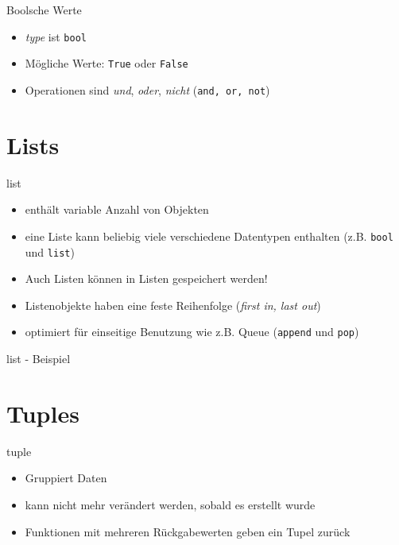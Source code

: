 \begin{frame}{Boolsche Werte}
	\begin{itemize}
		\item \textit{type} ist \alert{\texttt{bool}}
		\item Mögliche Werte: \texttt{True} oder \texttt{False}
		\item Operationen sind \textit{und}, \textit{oder}, \textit{nicht} (\texttt{and, or, not})
	\end{itemize}
\end{frame}


\section{Lists}

\begin{frame}{list}
	\begin{itemize}
		\item enthält variable Anzahl von Objekten
		\item eine Liste kann beliebig viele verschiedene Datentypen enthalten (z.B. \texttt{bool} und \texttt{list})
		\item Auch Listen können in Listen gespeichert werden!
		\item Listenobjekte haben eine feste Reihenfolge (\textit{first in, last out})
		\item optimiert für einseitige Benutzung wie z.B. Queue (\alert{\texttt{append}} und \alert{\texttt{pop}})
	\end{itemize}
\end{frame}

\begin{frame}{list - Beispiel}
	
\end{frame}


\section{Tuples}

\begin{frame}{tuple}
	\begin{itemize}
		\item Gruppiert Daten
		\item kann nicht mehr verändert werden, sobald es erstellt wurde
		\item Funktionen mit mehreren Rückgabewerten geben ein Tupel zurück
	\end{itemize}
\end{frame}

